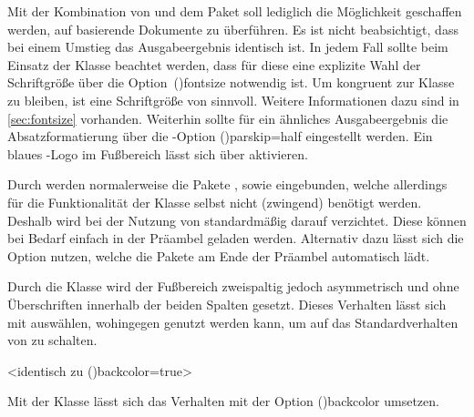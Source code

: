\begin{DeclareEntity}{}
Mit der Kombination von  und dem Paket 
soll lediglich die Möglichkeit geschaffen werden, auf  
basierende Dokumente zu überführen. Es ist nicht beabsichtigt, dass bei einem 
Umstieg das Ausgabeergebnis identisch ist. In jedem Fall sollte beim Einsatz 
der Klasse  beachtet werden, dass für diese eine explizite 
Wahl der Schriftgröße über die Option~\Option*(){fontsize} 
notwendig ist. Um kongruent zur Klasse  zu bleiben, ist 
eine Schriftgröße von  sinnvoll. Weitere Informationen dazu 
sind in \autoref{sec:fontsize} vorhanden. Weiterhin sollte für ein ähnliches 
Ausgabeergebnis die Absatzformatierung über die \KOMAScript-Option 
\Option*(){parskip=half} eingestellt werden. Ein blaues 
\DDC-Logo im Fußbereich lässt sich über  aktivieren.

\begin{Declaration}
  {}
\printdeclarationlist

Durch  werden normalerweise die Pakete , 
 sowie  eingebunden, welche allerdings für 
die Funktionalität der Klasse selbst nicht (zwingend) benötigt werden. Deshalb 
wird bei der Nutzung von  standardmäßig darauf verzichtet. 
Diese können bei Bedarf einfach in der Präambel geladen werden. Alternativ 
dazu lässt sich die Option  nutzen, welche die Pakete am 
Ende der Präambel automatisch lädt.
\end{Declaration}

\begin{Declaration}
  {}%
\printdeclarationlist

Durch die Klasse  wird der Fußbereich zweispaltig jedoch 
asymmetrisch und ohne Überschriften innerhalb der beiden Spalten gesetzt. 
Dieses Verhalten lässt sich mit  auswählen, wohingegen 
 genutzt werden kann, um auf das Standardverhalten 
von  zu schalten.
\end{Declaration}

\begin{Declaration}
  {}
  <identisch zu \Option*(){backcolor=true}>
\printdeclarationlist

Mit der Klasse  lässt sich das Verhalten mit der Option 
\Option*(){backcolor} umsetzen.
\end{Declaration}


\end{DeclareEntity}
